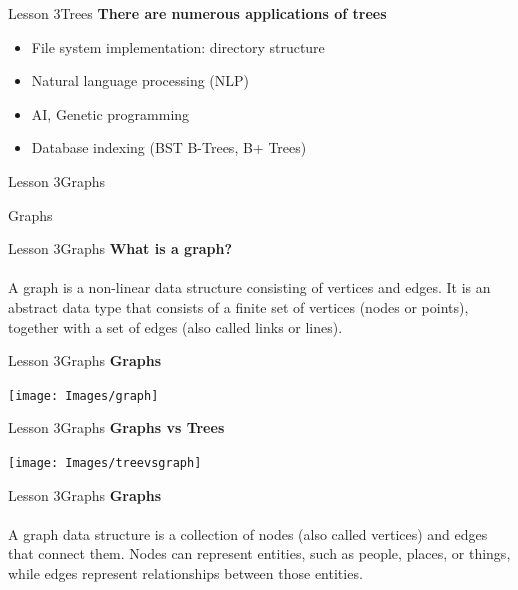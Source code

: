 \documentclass[aspectratio=1610]{beamer}
\begin{document}
\begin{frame}{Lesson 3}{Trees}
\LARGE
\textbf{There are numerous applications of trees}\\
\Large
\begin{itemize}
    \item File system implementation: directory structure
    \item Natural language processing (NLP)
    \item AI, Genetic programming
    \item Database indexing (BST B-Trees, B+ Trees)
\end{itemize}
\end{frame}



\begin{frame}{Lesson 3}{Graphs}
\begin{center}
\Huge Graphs
\end{center}
\end{frame}

\begin{frame}{Lesson 3}{Graphs}
\LARGE
\textbf{What is a graph?}\\~\\
A graph is a non-linear data structure consisting of vertices and
edges. It is an abstract data type that consists of a finite set of
vertices (nodes or points), together with a set of edges (also
called links or lines).
\end{frame}


\begin{frame}{Lesson 3}{Graphs}
\LARGE
\textbf{Graphs}\\
\begin{center}
\texttt{[image: Images/graph]}
\end{center}
\end{frame}


\begin{frame}{Lesson 3}{Graphs}
\LARGE
\textbf{Graphs vs Trees}\\
\begin{center}
\texttt{[image: Images/treevsgraph]}
\end{center}
\end{frame}


\begin{frame}{Lesson 3}{Graphs}
\LARGE
\textbf{Graphs}\\~\\
A graph data structure is a collection of nodes (also called
vertices) and edges that connect them. Nodes can represent entities,
such as people, places, or things, while edges represent
relationships between those entities.
\end{frame}
\end{document}
